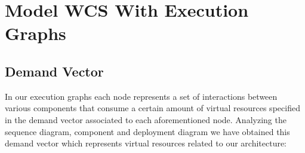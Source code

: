 \chapter{\textbf{Model WCS With Execution Graphs}}

\section{Demand Vector}

In our execution graphs each node represents a set of interactions between various components that consume a certain amount of virtual resources specified in the demand vector associated to each aforementioned node.
Analyzing the sequence diagram, component and deployment diagram we have obtained this demand vector which represents virtual resources related to our architecture:

